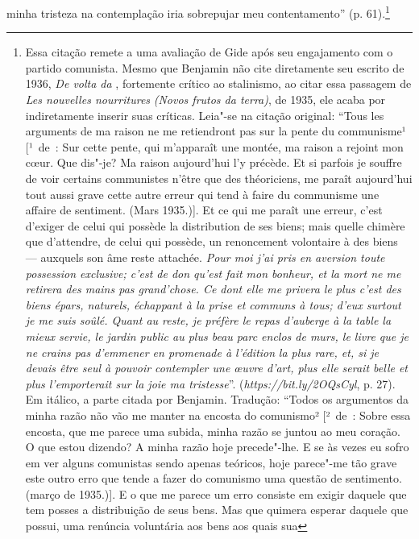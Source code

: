 minha tristeza na contemplação iria sobrepujar meu contentamento'' (p.
61).\footnote{Essa citação remete a uma avaliação de Gide após seu
  engajamento com o partido comunista. Mesmo que Benjamin não cite
  diretamente seu escrito de 1936, \emph{De volta da },
  fortemente crítico ao stalinismo, ao citar essa passagem de \emph{Les
  nouvelles nourritures} \emph{(Novos frutos da terra)}, de 1935, ele
  acaba por indiretamente inserir suas críticas. Leia"-se na citação
  original: ``Tous les arguments de ma raison ne me retiendront pas sur
  la pente du communisme¹ {[}¹~de~: Sur cette pente, qui m'apparaît une
  montée, ma raison a rejoint mon cœur. Que dis"-je? Ma raison
  aujourd'hui l'y précède. Et si parfois je souffre de voir certains
  communistes n'être que des théoriciens, me paraît aujourd'hui tout
  aussi grave cette autre erreur qui tend à faire du communisme une
  affaire de sentiment. (Mars 1935.){]}. Et ce qui me paraît une erreur,
  c'est d'exiger de celui qui possède la distribution de ses biens; mais
  quelle chimère que d'attendre, de celui qui possède, un renoncement
  volontaire à des biens --- auxquels son âme reste attachée. \emph{Pour
  moi j'ai pris en aversion toute possession exclusive; c'est de don
  qu'est fait mon bonheur, et la mort ne me retirera des mains pas
  grand'chose. Ce dont elle me privera le plus c'est des biens épars,
  naturels, échappant à la prise et communs à tous; d'eux surtout je me
  suis soûlé. Quant au reste, je préfère le repas d'auberge à la table
  la mieux servie, le jardin public au plus beau parc enclos de murs, le
  livre que je ne crains pas d'emmener en promenade à l'édition}
  \emph{la plus rare, et, si je devais être seul à pouvoir contempler
  une œuvre d'art, plus elle serait belle et plus l'emporterait
  sur la joie ma tristesse}''.
  (\emph{https://bit.ly/2OQsCyl}, p. 27). Em itálico, a parte citada por Benjamin. Tradução: ``Todos os
  argumentos da minha razão não vão me manter na encosta do
  comunismo² [²~de~: Sobre essa encosta, que me parece uma subida,
  minha razão se juntou ao meu coração. O que estou dizendo? A minha
  razão hoje precede"-lhe. E se às vezes eu sofro em ver alguns
  comunistas sendo apenas teóricos, hoje parece"-me tão grave este outro
  erro que tende a fazer do comunismo uma questão de sentimento. (março de 1935.)]. E o que me parece um erro consiste em exigir daquele
  que tem posses a distribuição de seus bens. Mas que quimera esperar
  daquele que possui, uma renúncia voluntária aos bens aos quais sua
}
